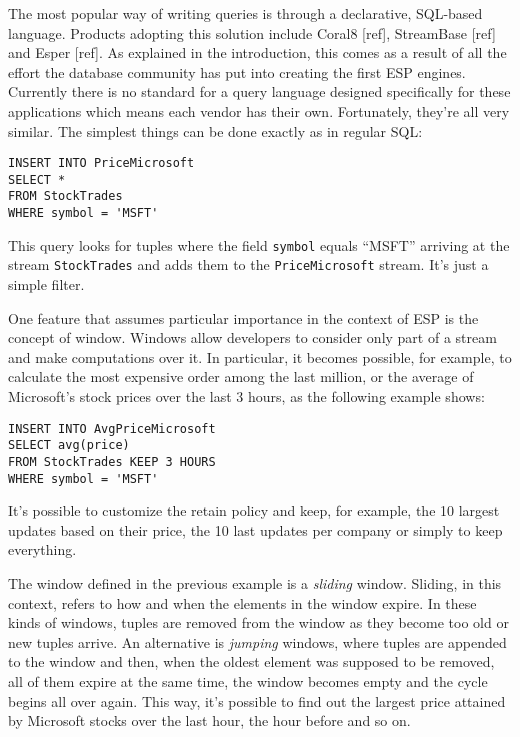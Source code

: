 \documentclass{report}
\begin{document}
The most popular way of writing queries is through a declarative,
SQL-based language. Products adopting this solution include Coral8
[ref], StreamBase [ref] and Esper [ref]. As explained in the
introduction, this comes as a result of all the effort the database
community has put into creating the first ESP engines. Currently there
is no standard for a query language designed specifically for these
applications which means each vendor has their own. Fortunately,
they're all very similar. The simplest things can be done exactly as
in regular SQL:

\begin{verbatim}
INSERT INTO PriceMicrosoft
SELECT *
FROM StockTrades
WHERE symbol = 'MSFT'
\end{verbatim}

This query looks for tuples where the field \verb=symbol= equals
``MSFT'' arriving at the stream \verb=StockTrades= and adds them to
the \verb=PriceMicrosoft= stream. It's just a simple filter.

One feature that assumes particular importance in the context of ESP
is the concept of window. Windows allow developers to consider only
part of a stream and make computations over it. In particular, it
becomes possible, for example, to calculate the most expensive order
among the last million, or the average of Microsoft's stock prices
over the last 3 hours, as the following example shows:

\begin{verbatim}
INSERT INTO AvgPriceMicrosoft
SELECT avg(price)
FROM StockTrades KEEP 3 HOURS
WHERE symbol = 'MSFT'
\end{verbatim}

It's possible to customize the retain policy and keep, for example,
the 10 largest updates based on their price, the 10 last updates per
company or simply to keep everything.

The window defined in the previous example is a \emph{sliding}
window. Sliding, in this context, refers to how and when the elements
in the window expire. In these kinds of windows, tuples are removed
from the window as they become too old or new tuples arrive. An
alternative is \emph{jumping} windows, where tuples are appended to
the window and then, when the oldest element was supposed to be
removed, all of them expire at the same time, the window becomes empty
and the cycle begins all over again. This way, it's possible to find
out the largest price attained by Microsoft stocks over the last hour,
the hour before and so on.
\end{document}
